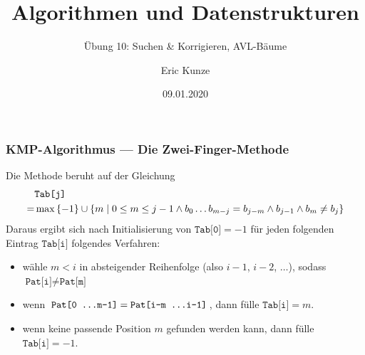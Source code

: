 \documentclass{beamer}
\begin{document}
	
	\title{Algorithmen und Datenstrukturen}
	\subtitle{Übung 10: Suchen \& Korrigieren, AVL-Bäume}
	\author{Eric Kunze}
	\date{09.01.2020}

	\maketitle



\begin{frame} \frametitle{KMP-Algorithmus --- Die Zwei-Finger-Methode}
	Die Methode beruht auf der Gleichung
	\begin{equation*}
		\begin{aligned}
		\small
		&\texttt{Tab[j]} \\
		= &\max \left\{ -1 \right\} \cup \left\{ m \mid 0 \le m \le j-1 \land b_0 \dots b_{m-j} = b_{j-m} \land b_{j-1} \land b_m \neq b_j \right\}
		\end{aligned}
	\end{equation*}
	Daraus ergibt sich nach Initialisierung von $\texttt{Tab[0]} = -1$ für jeden folgenden Eintrag $\texttt{Tab[i]}$ folgendes Verfahren:
	\begin{itemize}
		\item wähle $m < i$ in absteigender Reihenfolge (also $i-1$, $i-2$, $\dots$), sodass $\texttt{Pat[i]} \neq \texttt{Pat[m]}$
		\item wenn $\texttt{Pat[0 \dots m-1]} = \texttt{Pat[i-m \dots i-1]}$, dann fülle $\texttt{Tab[i]} = m$.
		\item wenn keine passende Position $m$ gefunden werden kann, dann fülle $\texttt{Tab[i]} = -1$.
	\end{itemize}
\end{frame}
\end{document}
